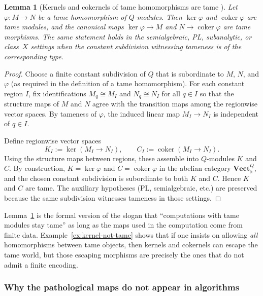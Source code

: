 \documentclass{article}
\newcommand{\kk}{\Bbbk}
\newcommand{\<}{\langle}
\renewcommand{\>}{\rangle}
\DeclareMathOperator{\coker}{coker}
\newtheorem{lemma}[theorem]{Lemma}
\theoremstyle{definition}
\theoremstyle{remark}
\begin{document}
	\begin{lemma}[Kernels and cokernels of tame homomorphisms are tame {\cite[Lem.~4.28]{Mil20}}]
		\label{lem:tame-kernel-cokernel}
		Let $\varphi\colon M\to N$ be a tame homomorphism of $Q$-modules.
		Then $\ker\varphi$ and $\coker\varphi$ are tame modules, and the canonical maps
		$\ker\varphi\to M$ and $N\to\coker\varphi$ are tame morphisms.
		The same statement holds in the semialgebraic, PL, subanalytic, or class~$X$ settings
		when the constant subdivision witnessing tameness is of the corresponding type.
	\end{lemma}

	\begin{proof}
		Choose a finite constant subdivision of $Q$ that is subordinate to $M$, $N$, and $\varphi$
		(as required in the definition of a tame homomorphism).
		For each constant region $I$, fix identifications $M_q\cong M_I$ and $N_q\cong N_I$
		for all $q\in I$ so that the structure maps of $M$ and $N$ agree with the transition
		maps among the regionwise vector spaces.
		By tameness of $\varphi$, the induced linear map $M_I\to N_I$ is independent of $q\in I$.

		Define regionwise vector spaces
		\[
			K_I:=\ker(M_I\to N_I),
			\qquad
			C_I:=\coker(M_I\to N_I).
		\]
		Using the structure maps between regions, these assemble into $Q$-modules $K$ and $C$.
		By construction, $K=\ker\varphi$ and $C=\coker\varphi$ in the abelian category
		$\mathbf{Vect}_{\kk}^{Q}$, and the chosen constant subdivision is subordinate to both $K$
		and $C$.  Hence $K$ and $C$ are tame.  The auxiliary hypotheses (PL, semialgebraic, etc.)
		are preserved because the same subdivision witnesses tameness in those settings.
	\end{proof}

	Lemma~\ref{lem:tame-kernel-cokernel} is the formal version of the slogan that
	``computations with tame modules stay tame'' as long as the maps used in the computation
	come from finite data.  Example~\ref{ex:kernel-not-tame} shows that if one insists on allowing
	\emph{all} homomorphisms between tame objects, then kernels and cokernels can escape the tame
	world, but those escaping morphisms are precisely the ones that do not admit a finite encoding.

	\subsubsection*{Why the pathological maps do not appear in algorithms}
\end{document}

